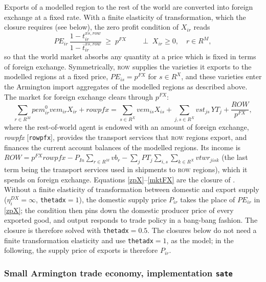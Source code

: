 Exports of a modelled region to the rest of the world are converted into foreign exchange at a fixed rate.
With a finite elasticity of transformation, which the \SOE closure requires (see below), the zero profit condition of $X_{ir}$ reads
\begin{equation}\label{zpX}
\mathit{PE}_{ir}\,\frac{1-t^{xs,row}_{ir}}{1-\overline{t}^{xs,row}_{ir}} \;\geq\; p^{FX}
\qquad \perp \; X_{ir}\geq 0, \quad r\in R^M,
\end{equation}
so that the world market absorbs any quantity at a price which is fixed in terms of foreign exchange.
Symmetrically, \textsc{row} supplies the varieties it exports to the modelled regions at a fixed price, $\mathit{PE}_{is}=p^{FX}$ for $s\in R^X$, and these varieties enter the Armington import aggregates of the modelled regions as described above.
The market for foreign exchange clears through $p^{FX}$:
\begin{equation}\label{mktFX}
\sum_{r\in R^M}\textit{pem}^0_{ir}\textit{vem}_{ir}X_{ir} + \textit{rowpfx}
= \sum_{s\in R^X}\textit{vem}_{is}X_{is} + \sum_{j,s\in R^X}\textit{vst}_{js}\,\mathit{YT}_j
+ \frac{\mathit{ROW}}{p^{FX}},
\end{equation}
where the rest-of-world agent is endowed with an amount of foreign exchange, \textit{rowpfx} [\texttt{rowpfx}], provides the transport services that \textsc{row} regions export, and finances the current account balances of the modelled regions.
Its income is $\mathit{ROW}=p^{FX}\textit{rowpfx} - P_{In}\sum_{r\in R^M}\textit{vb}_r - \sum_j \mathit{PT}_j\sum_{i,s}\sum_{k\in R^X}\textit{vtwr}_{jisk}$ (the last term being the transport services used in shipments to \textsc{row} regions), which it spends on foreign exchange.
Equations \eqref{zpX}--\eqref{mktFX} are the closure of \citet{LanzRutherford2016}.
Without a finite elasticity of transformation between domestic and export supply ($\eta^{DX}_i=\infty$, \texttt{thetadx}$=1$), the domestic supply price $P_{ir}$ takes the place of $\mathit{PE}_{ir}$ in \eqref{zpX}; the condition then pins down the domestic producer price of every exported good, and output responds to trade policy in a bang-bang fashion.
The \SOE closure is therefore solved with \texttt{thetadx}$=0.5$.
The \SATE closures below do not need a finite transformation elasticity and use \texttt{thetadx}$=1$, as the \GMR model; in the following, the supply price of exports is therefore $P_{ir}$.

\subsubsection{Small Armington trade economy, implementation \texttt{sate}}

